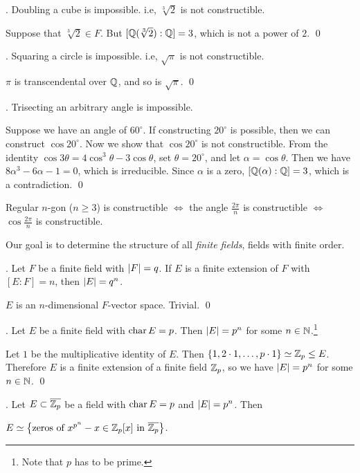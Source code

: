 \thm. Doubling a cube is impossible. i.e, \(\sqrt[3]{2}\) is not constructible.

\pf Suppose that \(\sqrt[3]{2} \in F\). But \([\mathbb{Q}(\sqrt[3]{2}) : \mathbb{Q}] = 3\), which is not a power of \(2\). \qed

\thm. Squaring a circle is impossible. i.e, \(\sqrt{\pi}\) is not constructible.

\pf \(\pi\) is transcendental over \(\mathbb{Q}\), and so is \(\sqrt{\pi}\). \qed

\thm. Trisecting an arbitrary angle is impossible.

\pf Suppose we have an angle of \(60^\circ\). If constructing \(20^\circ\) is possible, then we can construct \(\cos 20^\circ\). Now we show that \(\cos 20^\circ\) is not constructible. From the identity \(\cos 3\theta = 4\cos^3 \theta - 3\cos\theta\), set \(\theta = 20^\circ\), and let \(\alpha = \cos \theta\). Then we have \(8\alpha^3 - 6\alpha - 1 = 0\), which is irreducible. Since \(\alpha\) is a zero, \([\mathbb{Q}(\alpha) : \mathbb{Q}] = 3\), which is a contradiction. \qed

\rmk Regular \(n\)-gon (\(n \geq 3\)) is constructible \(\iff\) the angle \(\frac{2\pi}{n}\) is constructible \(\iff\) \(\cos \frac{2\pi}{n}\) is constructible.

\pagebreak


Our goal is to determine the structure of all \textit{finite fields}, fields with finite order.

\thm. Let \(F\) be a finite field with \(\left| F \right| = q\). If \(E\) is a finite extension of \(F\) with \([E : F] = n\), then \(\left| E \right| = q^n\).

\pf \(E\) is an \(n\)-dimensional \(F\)-vector space. Trivial. \qed

\cor. Let \(E\) be a finite field with \(\operatorname{char} E = p\). Then \(\left| E \right| = p^n\) for some \(n \in \mathbb{N}\).\footnote{Note that \(p\) has to be prime.}

\pf Let \(1\) be the multiplicative identity of \(E\). Then \(\{1, 2 \cdot 1, \dots, p \cdot 1\} \simeq \mathbb{Z}_p \leq E\). Therefore \(E\) is a finite extension of a finite field \(\mathbb{Z}_p\), so we have \(\left| E \right| = p^n\) for some \(n \in \mathbb{N}\). \qed

\thm. Let \(E \subset \bar{\Z_p}\) be a field with \(\operatorname{char} E = p\) and \(\left| E \right| = p^n\). Then
\begin{center}
    \(E \simeq \left\{ \text{zeros of } x^{p^n} - x \in \Z_p[x] \text{ in } \bar{\Z_p} \right\}\).
\end{center}

